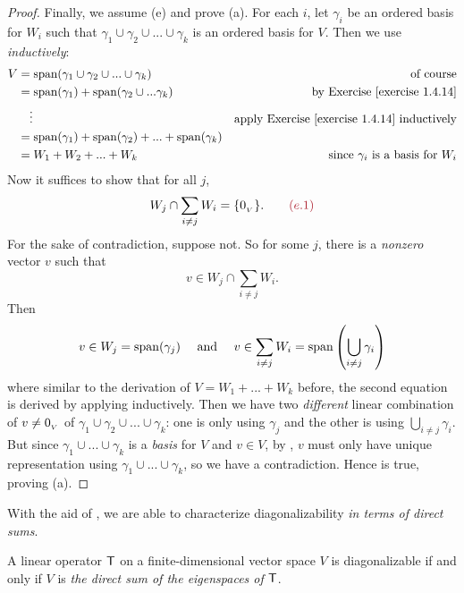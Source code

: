 \begin{proof}
Finally, we assume (e) and prove (a).
For each \(i\), let \(\gamma_i\) be an ordered basis for \(W_i\) such that \(\gamma_1 \cup \gamma_2 \cup ... \cup \gamma_k\) is an ordered basis for \(V\).
Then we use  \emph{inductively}:
\begin{align*}
    V & = \spann(\gamma_1 \cup \gamma_2 \cup ... \cup \gamma_k) & \text{of course} \\
      & = \spann(\gamma_1) + \spann(\gamma_2 \cup ... \gamma_k) & \text{by \EXEC{1.4.14}} \\
      & \quad \vdots & \text{apply \EXEC{1.4.14} inductively} \\
      & = \spann(\gamma_1) + \spann(\gamma_2) + ... + \spann(\gamma_k) \\
      & = W_1 + W_2 + ... + W_k & \text{since \(\gamma_i\) is a basis for \(W_i\)}
\end{align*}
Now it suffices to show that for all \(j\),
\[
    W_j \cap \sum_{i \ne j} W_{i} = \{ \OV \}. \quad \quad \MAROON{(e.1)}
\]
For the sake of contradiction, suppose not.
So for some \(j\), there is a \emph{nonzero} vector \(v\) such that
\[
    v \in W_j \cap \sum_{i \ne j} W_i.
\]
Then
\[
    v \in W_j = \operatorname{span}(\gamma_j)
    \quad \text{ and } \quad
    v \in \sum_{i \ne j} W_i = \operatorname{span} \left( \bigcup_{i \ne j} \gamma_i \right)
\]
where similar to the derivation of \(V = W_1 + ... + W_k\) before, the second equation is derived by applying  inductively.
Then we have two \emph{different} linear combination of \(v \ne 0_{_V}\) of \(\gamma_1 \cup \gamma_2 \cup ... \cup \gamma_k\): one is only using \(\gamma_j\) and the other is using \(\bigcup_{i \ne j} \gamma_i\).
But since \(\gamma_1 \cup ... \cup \gamma_k\) is a \emph{basis} for \(V\) and \(v \in V\), by , \(v\) must only have unique representation using \(\gamma_1 \cup ... \cup \gamma_k\), so we have a contradiction.
Hence  is true, proving (a).
\end{proof}

With the aid of , we are able to characterize diagonalizability \emph{in terms of direct sums}.

\begin{theorem} \label{thm 5.10}
A linear operator \(\textsf{T}\) on a finite-dimensional vector space \(V\) is diagonalizable if and only if \(V\) is \emph{the direct sum of the eigenspaces of \(\textsf{T}\)}.
\end{theorem}

